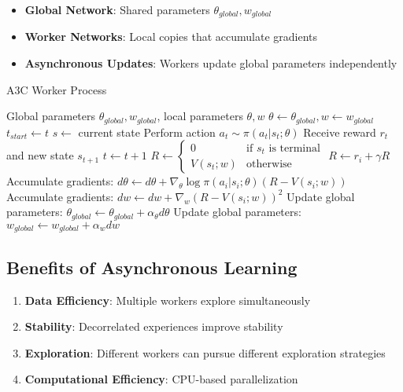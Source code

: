 \begin{itemize}
    \item \textbf{Global Network}: Shared parameters $\theta_{global}, w_{global}$
    \item \textbf{Worker Networks}: Local copies that accumulate gradients
    \item \textbf{Asynchronous Updates}: Workers update global parameters independently
\end{itemize}

\begin{algorithm}
\caption{A3C Worker Process}
\begin{algorithmic}
\REQUIRE Global parameters $\theta_{global}, w_{global}$, local parameters $\theta, w$
\REPEAT
    \STATE $\theta \leftarrow \theta_{global}, w \leftarrow w_{global}$ 
    \STATE $t_{start} \leftarrow t$
    \STATE $s \leftarrow$ current state
    \REPEAT
        \STATE Perform action $a_t \sim \pi(a_t|s_t; \theta)$
        \STATE Receive reward $r_t$ and new state $s_{t+1}$
        \STATE $t \leftarrow t + 1$
    \STATE $R \leftarrow \begin{cases} 0 & \text{if } s_t \text{ is terminal} \\ V(s_t; w) & \text{otherwise} \end{cases}$
        \STATE $R \leftarrow r_i + \gamma R$
        \STATE Accumulate gradients: $d\theta \leftarrow d\theta + \nabla_\theta \log \pi(a_i|s_i; \theta)(R - V(s_i; w))$
        \STATE Accumulate gradients: $dw \leftarrow dw + \nabla_w (R - V(s_i; w))^2$
    \ENDFOR
    \STATE Update global parameters: $\theta_{global} \leftarrow \theta_{global} + \alpha_\theta d\theta$
    \STATE Update global parameters: $w_{global} \leftarrow w_{global} + \alpha_w dw$
\end{algorithmic}
\end{algorithm}

\subsection{Benefits of Asynchronous Learning}

\begin{enumerate}
    \item \textbf{Data Efficiency}: Multiple workers explore simultaneously
    \item \textbf{Stability}: Decorrelated experiences improve stability
    \item \textbf{Exploration}: Different workers can pursue different exploration strategies
    \item \textbf{Computational Efficiency}: CPU-based parallelization
\end{enumerate}


